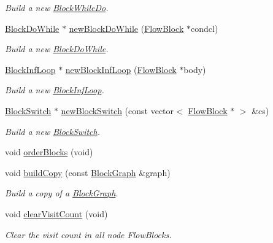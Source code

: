 \begin{DoxyCompactItemize}
\begin{DoxyCompactList}\small\item\em Build a new \mbox{\hyperlink{class_block_while_do}{Block\+While\+Do}}. \end{DoxyCompactList}\item 
\mbox{\hyperlink{class_block_do_while}{Block\+Do\+While}} $\ast$ \mbox{\hyperlink{class_block_graph_ae61c4c6c6ab865760a6855ced92ae809}{new\+Block\+Do\+While}} (\mbox{\hyperlink{class_flow_block}{Flow\+Block}} $\ast$condcl)
\begin{DoxyCompactList}\small\item\em Build a new \mbox{\hyperlink{class_block_do_while}{Block\+Do\+While}}. \end{DoxyCompactList}\item 
\mbox{\hyperlink{class_block_inf_loop}{Block\+Inf\+Loop}} $\ast$ \mbox{\hyperlink{class_block_graph_a4729c7a662b511b4112361e063336c36}{new\+Block\+Inf\+Loop}} (\mbox{\hyperlink{class_flow_block}{Flow\+Block}} $\ast$body)
\begin{DoxyCompactList}\small\item\em Build a new \mbox{\hyperlink{class_block_inf_loop}{Block\+Inf\+Loop}}. \end{DoxyCompactList}\item 
\mbox{\hyperlink{class_block_switch}{Block\+Switch}} $\ast$ \mbox{\hyperlink{class_block_graph_a2e96df7e537a3f92320addcf01515e5d}{new\+Block\+Switch}} (const vector$<$ \mbox{\hyperlink{class_flow_block}{Flow\+Block}} $\ast$ $>$ \&cs)
\begin{DoxyCompactList}\small\item\em Build a new \mbox{\hyperlink{class_block_switch}{Block\+Switch}}. \end{DoxyCompactList}\item 
void \mbox{\hyperlink{class_block_graph_a1da91d469ca3583ac7408e90443f0e09}{order\+Blocks}} (void)
\item 
void \mbox{\hyperlink{class_block_graph_a85422522e8c61496c5253f410f140fcc}{build\+Copy}} (const \mbox{\hyperlink{class_block_graph}{Block\+Graph}} \&graph)
\begin{DoxyCompactList}\small\item\em Build a copy of a \mbox{\hyperlink{class_block_graph}{Block\+Graph}}. \end{DoxyCompactList}\item 
void \mbox{\hyperlink{class_block_graph_ad5a3ac8db8d8d2e4fc0ddc1c6b1dab0d}{clear\+Visit\+Count}} (void)
\begin{DoxyCompactList}\small\item\em Clear the visit count in all node Flow\+Blocks. \end{DoxyCompactList}\item 

\end{DoxyCompactItemize}
